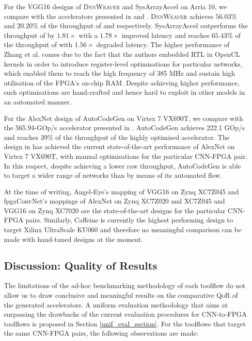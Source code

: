\documentclass[format=acmsmall, review=false, screen=true]{acmart}
\begin{document}
For the VGG16 designs of \textsc{DnnWeaver} and SysArrayAccel on Arria 10, we compare with the accelerators presented in \cite{Ma_2017} and \cite{Zhang_2017}. \textsc{DnnWeaver} achieves $56.03 \%$ and $20.20 \%$ of the throughput of \cite{Ma_2017} and \cite{Zhang_2017} respectively. SysArrayAccel outperforms the throughput of \cite{Ma_2017} by $1.81 \times$ with a $1.78 \times$ improved latency and reaches $65.43 \%$ of the throughput of \cite{Zhang_2017} with $1.56 \times$ degraded latency. The higher performance of Zhang et al. \cite{Zhang_2017} comes due to the fact that the authors embedded RTL in OpenCL kernels in order to introduce register-level optimisations for particular networks, which enabled them to reach the high frequency of 385 MHz and sustain high utilisation of the FPGA's on-chip RAM. Despite achieving higher performance, such optimisations are hand-crafted and hence hard to exploit in other models in an automated manner.

{\color{black}For the AlexNet design of AutoCodeGen on Virtex 7 VX690T, we compare with the \mbox{565.94-GOp/s} accelerator presented in \cite{Li2017fpl}. AutoCodeGen achieves 222.1 GOp/s and reaches 39\% of the throughput of the highly optimised accelerator. The design in \cite{Li2017fpl} has achieved the current state-of-the-art performance of AlexNet on Virtex 7 VX690T, with manual optimisations for the particular CNN-FPGA pair. In this respect, despite achieving a lower raw throughput, AutoCodeGen is able to target a wider range of networks than \cite{Li2017fpl} by means of its automated flow.}

At the time of writing, Angel-Eye's mapping of VGG16 on Zynq XC7Z045 and fpgaConvNet's mappings of AlexNet on Zynq XC7Z020 and XC7Z045 and VGG16 on Zynq XC7020 are the state-of-the-art designs for the particular CNN-FPGA pairs. Similarly, Caffeine is currently the highest performing design to target Xilinx UltraScale KU060 and therefore no meaningful comparison can be made with hand-tuned designs at the moment. 


\subsection{Discussion: Quality of Results}
The limitations of the ad-hoc benchmarking methodology of each toolflow do not allow us to draw conclusive and meaningful results on the comparative QoR of the generated accelerators. A uniform evaluation methodology that aims at surpassing the drawbacks of the current evaluation procedures for CNN-to-FPGA toolflows is proposed in Section \ref{unif_eval_section}. For the toolflows that target the same CNN-FPGA pairs, the following observations are made:
\end{document}
